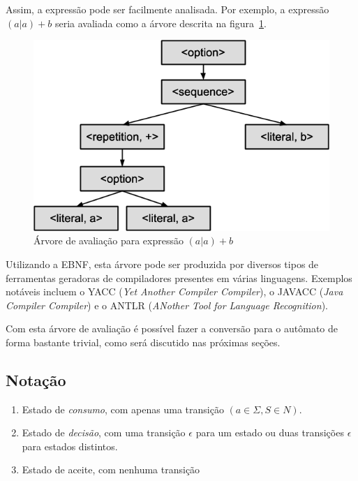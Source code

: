 \documentclass[a4paper,12pt,oneside,onecolumn]{uerj}
\begin{document}
Assim, a expressão pode ser facilmente analisada. Por exemplo, a expressão $(a|a)+b$ seria avaliada como a árvore descrita na figura~\ref{fig:aab_parse_tree}.

\begin{figure}[!htbp]
  \centering
  \includegraphics[scale=0.5]{figures/aab_parse_tree.png}
  \caption{Árvore de avaliação para expressão $(a|a)+b$}
  \label{fig:aab_parse_tree}
\end{figure}

Utilizando a EBNF, esta árvore pode ser produzida por diversos tipos de ferramentas geradoras de compiladores presentes em várias linguagens. Exemplos notáveis incluem o YACC (\emph{Yet Another Compiler Compiler}), o JAVACC (\emph{Java Compiler Compiler}) e o ANTLR (\emph{ANother Tool for Language Recognition}).

Com esta árvore de avaliação é possível fazer a conversão para o autômato de forma bastante trivial, como será discutido nas próximas seções.

\subsection{Notação}
\label{sec:Notacao}

\begin{enumerate}
    \item Estado de \emph{consumo},  com apenas uma transição $(a \in \Sigma, S \in N)$.
    \item Estado de \emph{decisão}, com uma transição $\epsilon$ para um estado ou duas transições $\epsilon$ para estados distintos.
    \item Estado de aceite, com nenhuma transição
\end{enumerate}
\end{document}
